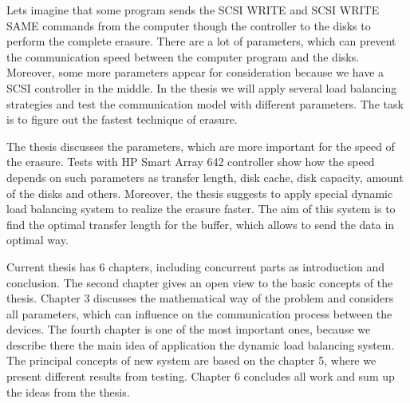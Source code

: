 Lets imagine that some program sends the SCSI WRITE and SCSI WRITE SAME commands from the computer though the controller to the disks to perform the complete erasure. There are a lot of parameters, which can prevent the communication speed between the computer program and the disks. Moreover, some more parameters appear for consideration because we have a SCSI controller in the middle. In the thesis we will apply several load balancing strategies and test the communication model with different parameters. The task is to figure out the fastest technique of erasure.

The thesis discusses the parameters, which are more important for the speed of the erasure. Tests with HP Smart Array 642 controller show how the speed depends on such parameters as transfer length, disk cache, disk capacity, amount of the disks and others. Moreover, the thesis suggests to apply special dynamic load balancing system to realize the erasure faster. The aim of this system is to find the optimal transfer length for the buffer, which allows to send the data in optimal way. 

Current thesis has 6 chapters, including concurrent parts as introduction and conclusion. The second chapter gives an open view to the basic concepts of the thesis. Chapter 3 discusses the mathematical way of the problem and considers all parameters, which can influence on the communication process between the devices. The fourth chapter is one of the most important ones, because we describe there the main idea of application the dynamic load balancing system. The principal concepts of new system are based on the chapter 5, where we present different results from testing. Chapter 6 concludes all work and sum up the ideas from the thesis.

